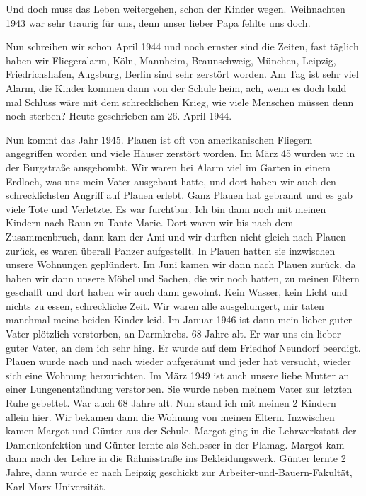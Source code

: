 \documentclass[a5paper,11pt,openany]{book}
\newcommand{\seite}[1]{\leavevmode\marginpar{\footnotesize\itshape\raggedright #1}\ignorespaces}
\begin{document}
\seite{69}
Und doch muss das Leben weitergehen, schon der Kinder wegen.
Weihnachten 1943 war sehr traurig für uns, denn unser lieber Papa fehlte uns doch.

Nun schreiben wir schon April 1944 und noch ernster sind die Zeiten, fast täglich haben wir Fliegeralarm,
  Köln, Mannheim, Braunschweig, München, Leipzig, Friedrichshafen, Augsburg, Berlin sind sehr zerstört worden.
Am Tag ist sehr viel Alarm, die Kinder kommen dann von der Schule heim,
  ach, wenn es doch bald
\seite{70}
mal Schluss wäre mit dem schrecklichen Krieg, wie viele Menschen müssen denn noch sterben?
Heute geschrieben am 26. April 1944.

Nun kommt das Jahr 1945.
Plauen ist oft von amerikanischen Fliegern angegriffen worden und viele Häuser zerstört worden.
Im März 45 wurden wir in der Burgstraße ausgebombt.
Wir waren bei Alarm viel im Garten in einem Erdloch, was uns mein Vater ausgebaut hatte,
  und dort haben wir auch den schrecklichsten Angriff auf Plauen erlebt.
Ganz Plauen hat
\seite{71}
gebrannt und es gab viele Tote und Verletzte.
Es war furchtbar.
Ich bin dann noch mit meinen Kindern nach Raun zu Tante Marie.
Dort waren wir bis nach dem Zusammenbruch,
  dann kam der Ami und wir durften nicht gleich nach Plauen zurück, es waren überall Panzer aufgestellt.
In Plauen hatten sie inzwischen unsere Wohnungen geplündert.
Im Juni kamen wir dann nach Plauen zurück,
  da haben wir dann unsere Möbel und Sachen, die wir noch hatten, zu meinen Eltern geschafft und dort haben wir auch dann gewohnt.
Kein Wasser,
\seite{72}
kein Licht und nichts zu essen, schreckliche Zeit.
Wir waren alle ausgehungert, mir taten manchmal meine beiden Kinder leid.
Im Januar 1946 ist dann mein lieber guter Vater plötzlich verstorben, an Darmkrebs.
68 Jahre alt.
Er war uns ein lieber guter Vater, an dem ich sehr hing.
Er wurde auf dem Friedhof Neundorf beerdigt.
Plauen wurde nach und nach wieder aufgeräumt und jeder hat versucht, wieder sich eine Wohnung herzurichten.
Im März 1949 ist auch unsere liebe Mutter an einer Lungenentzündung verstorben.
Sie wurde neben meinem Vater zur
\seite{73}
letzten Ruhe gebettet.
War auch 68 Jahre alt.
Nun stand ich mit meinen 2 Kindern allein hier.
Wir bekamen dann die Wohnung von meinen Eltern.
Inzwischen kamen Margot und Günter aus der Schule.
Margot ging in die Lehrwerkstatt der Damenkonfektion und Günter lernte als Schlosser in der Plamag.
Margot kam dann nach der Lehre in die Rähnisstraße ins Bekleidungswerk.
Günter lernte 2 Jahre, dann wurde er nach Leipzig geschickt zur Arbeiter-und-Bauern-Fakultät, Karl-Marx-Universität.
\end{document}
